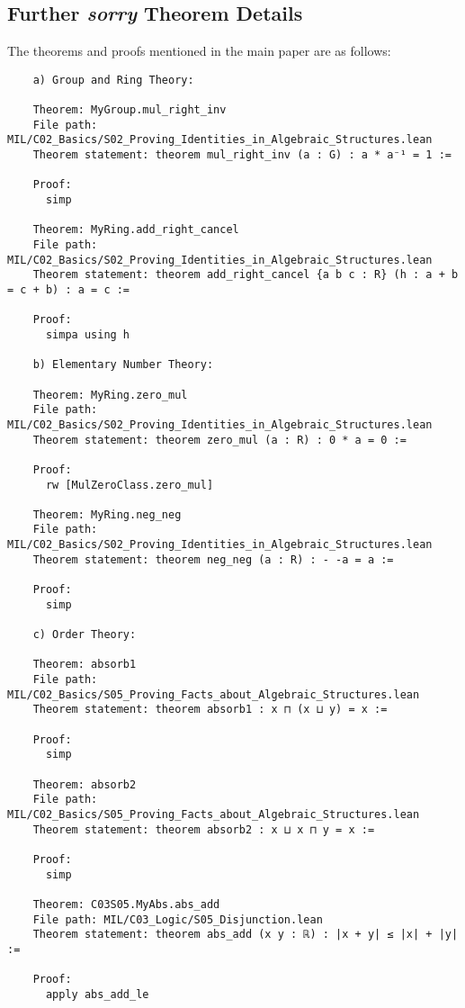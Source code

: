 \documentclass{article} %
\begin{document}
\subsection{Further \textit{sorry} Theorem Details}

The theorems and proofs mentioned in the main paper are as follows:

\begin{verbatim}
    a) Group and Ring Theory:

    Theorem: MyGroup.mul_right_inv
    File path: MIL/C02_Basics/S02_Proving_Identities_in_Algebraic_Structures.lean
    Theorem statement: theorem mul_right_inv (a : G) : a * a⁻¹ = 1 :=
    
    Proof:
      simp
    
    Theorem: MyRing.add_right_cancel
    File path: MIL/C02_Basics/S02_Proving_Identities_in_Algebraic_Structures.lean
    Theorem statement: theorem add_right_cancel {a b c : R} (h : a + b = c + b) : a = c :=
    
    Proof:
      simpa using h

    b) Elementary Number Theory:

    Theorem: MyRing.zero_mul
    File path: MIL/C02_Basics/S02_Proving_Identities_in_Algebraic_Structures.lean
    Theorem statement: theorem zero_mul (a : R) : 0 * a = 0 :=
    
    Proof:
      rw [MulZeroClass.zero_mul]
    
    Theorem: MyRing.neg_neg
    File path: MIL/C02_Basics/S02_Proving_Identities_in_Algebraic_Structures.lean
    Theorem statement: theorem neg_neg (a : R) : - -a = a :=
    
    Proof:
      simp

    c) Order Theory:

    Theorem: absorb1
    File path: MIL/C02_Basics/S05_Proving_Facts_about_Algebraic_Structures.lean
    Theorem statement: theorem absorb1 : x ⊓ (x ⊔ y) = x :=
    
    Proof:
      simp
    
    Theorem: absorb2
    File path: MIL/C02_Basics/S05_Proving_Facts_about_Algebraic_Structures.lean
    Theorem statement: theorem absorb2 : x ⊔ x ⊓ y = x :=
    
    Proof:
      simp

    Theorem: C03S05.MyAbs.abs_add
    File path: MIL/C03_Logic/S05_Disjunction.lean
    Theorem statement: theorem abs_add (x y : ℝ) : |x + y| ≤ |x| + |y| :=
    
    Proof:
      apply abs_add_le


\end{verbatim}
\end{document}
